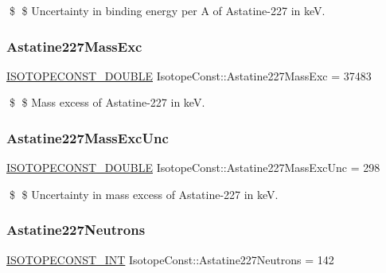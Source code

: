 \$ \$ Uncertainty in binding energy per A of Astatine-\/227 in keV. \mbox{\label{group___isotope_const-_astatine-_at227_ga1d0641def1c1bba9b9451c94a74c7360}} 
\subsubsection{\texorpdfstring{Astatine227\+Mass\+Exc}{Astatine227MassExc}}
{\footnotesize\ttfamily \mbox{\hyperlink{group___isotope_const-_macros_ga8f45a7272ce02c0b4c65c44636ed719a}{I\+S\+O\+T\+O\+P\+E\+C\+O\+N\+S\+T\+\_\+\+D\+O\+U\+B\+LE}} Isotope\+Const\+::\+Astatine227\+Mass\+Exc = 37483}

\$ \$ Mass excess of Astatine-\/227 in keV. \mbox{\label{group___isotope_const-_astatine-_at227_ga489c1567f8f1f1313b9a937de80574af}} 
\subsubsection{\texorpdfstring{Astatine227\+Mass\+Exc\+Unc}{Astatine227MassExcUnc}}
{\footnotesize\ttfamily \mbox{\hyperlink{group___isotope_const-_macros_ga8f45a7272ce02c0b4c65c44636ed719a}{I\+S\+O\+T\+O\+P\+E\+C\+O\+N\+S\+T\+\_\+\+D\+O\+U\+B\+LE}} Isotope\+Const\+::\+Astatine227\+Mass\+Exc\+Unc = 298}

\$ \$ Uncertainty in mass excess of Astatine-\/227 in keV. \mbox{\label{group___isotope_const-_astatine-_at227_ga520bff0a6066246a4432432cf4fcb66d}} 
\subsubsection{\texorpdfstring{Astatine227\+Neutrons}{Astatine227Neutrons}}
{\footnotesize\ttfamily \mbox{\hyperlink{group___isotope_const-_macros_ga5f18360b3e99483a35c32d789e62621c}{I\+S\+O\+T\+O\+P\+E\+C\+O\+N\+S\+T\+\_\+\+I\+NT}} Isotope\+Const\+::\+Astatine227\+Neutrons = 142}


